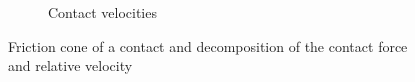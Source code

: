 \begin{figure}[htp]
\begin{subfigure}[b]{0.47\textwidth}
	\caption{Contact velocities}
	\label{fig:friction_cube}
\end{subfigure}
\caption[Friction cone and relative velocities]{Friction cone of a contact and decomposition of the contact force and relative velocity}
\label{fig:ph}
\end{figure}